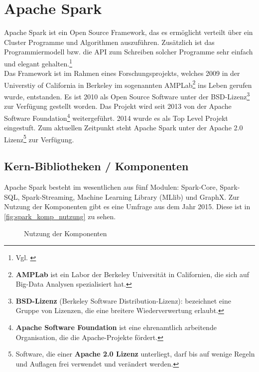 \newpage
\chapter{Apache Spark} 

Apache Spark ist ein Open Source Framework, das es ermöglicht verteilt über ein Cluster Programme und Algorithmen auszuführen. Zusätzlich ist das Programmiermodell bzw. die API zum Schreiben solcher Programme sehr einfach und elegant gehalten.\footnote{Vgl. \cite{AAWS15}} \\

\noindent
Das Framework ist im Rahmen eines Forschungsprojekts, welches 2009 in der Universtiy of California in Berkeley im sogenannten AMPLab\footnote{\textbf{AMPLab} ist ein Labor der Berkeley Universität in Californien, die sich auf Big-Data Analysen spezialisiert hat. } ins Leben gerufen wurde, entstanden. Es ist 2010 als Open Source Software unter der BSD-Lizenz\footnote{\textbf{BSD-Lizenz} (Berkeley Software Distribution-Lizenz): bezeichnet eine Gruppe von Lizenzen, die eine breitere Wiederverwertung erlaubt.} zur Verfügung gestellt worden. Das Projekt wird seit 2013 von der Apache Software Foundation\footnote{\textbf{Apache Software Foundation} ist eine ehrenamtlich arbeitende Organisation, die die Apache-Projekte fördert.} weitergeführt. 2014 wurde es als Top Level Projekt eingestuft. Zum aktuellen Zeitpunkt steht Apache Spark unter der Apache 2.0 Lizenz\footnote{Software, die einer \textbf{Apache 2.0 Lizenz} unterliegt, darf bis auf wenige Regeln und Auflagen frei verwendet und verändert werden.} zur Verfügung. \\



\section{Kern-Bibliotheken / Komponenten}

Apache Spark besteht im wesentlichen aus fünf Modulen: Spark-Core, Spark-SQL, Spark-Streaming, Machine Learning Library (MLlib) und GraphX. Zur Nutzung der Komponenten gibt es eine Umfrage aus dem Jahr 2015. Diese ist in \autoref{fig:spark_komp_nutzung} zu sehen. \\

\begin{figure}[h]
  \centering
  \caption{Nutzung der Komponenten \cite{ZXW+16}}\label{fig:spark_komp_nutzung}
\end{figure}


